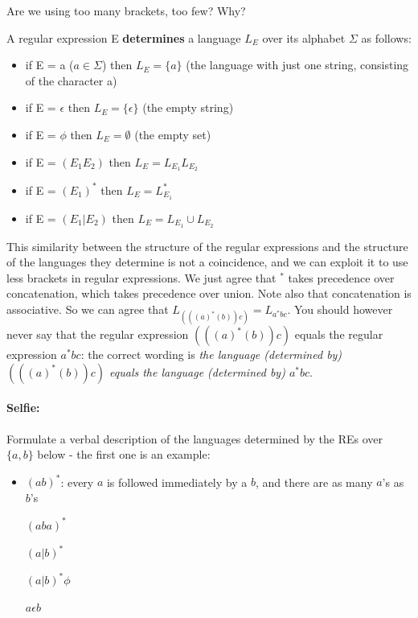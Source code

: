 Are we using too many brackets, too few? Why?

\begin{definition}
A regular expression E {\bf determines} a
language $L_E$ over its alphabet $\Sigma$ as follows:
\begin{itemize}
\item if E = a ($a \in \Sigma$) then $L_E = \{a\}$ (the language with
just one string, consisting of the character a)
\item if E = $\epsilon$ then $L_E = \{\epsilon\}$ (the empty string)
\item if E = $\phi$ then $L_E = \emptyset$ (the empty set)
\item if E = $(E_1E_2)$ then $L_E = L_{E_1}L_{E_2}$
\item if E = $(E_1)^*$ then $L_E = L_{E_1}^*$
\item if E = $(E_1 | E_2)$ then $L_E = L_{E_1} \cup L_{E_2}$
\end{itemize}
\end{definition}

This similarity between the structure of the regular expressions and
the structure of the languages they determine is not a coincidence,
and we can exploit it to use less brackets in regular expressions. We
just agree that $^*$ takes precedence over concatenation, which takes
precedence over union. Note also that concatenation is associative. So
we can agree that $L_{(((a)^*(b))c)} = L_{a^*bc}$. You should however
never say that the regular expression $(((a)^*(b))c)$ equals the
regular expression $a^*bc$: the correct wording is {\em the language
(determined by) $(((a)^*(b))c)$ equals the language (determined by)
$a^*bc$}.

\paragraph{Selfie:}
Formulate a verbal description of the languages determined by the REs
over $\{a,b\}$ below - the first one is an example:

\begin{itemize}
\item[]
$(ab)^*$: every $a$ is followed immediately by a $b$, and there are as
many $a$'s as $b$'s

$(aba)^*$

$(a|b)^*$

$(a|b)^*\phi$

$a \epsilon b$
\end{itemize}

